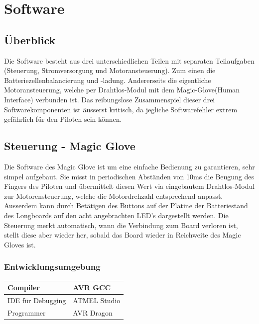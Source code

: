 \chapter{Software} \label{Software}
\section{Überblick}
Die Software besteht aus drei unterschiedlichen Teilen mit separaten Teilaufgaben (Steuerung, Stromversorgung und Motoransteuerung). Zum einen die Batteriezellenbalancierung und -ladung. Andererseits die eigentliche Motoransteuerung, welche per Drahtlos-Modul mit dem Magic-Glove(Human Interface) verbunden ist. Das reibungslose Zusammenspiel dieser drei Softwarekomponenten ist äusserst kritisch, da jegliche Softwarefehler extrem gefährlich für den Piloten sein können.
\section{Steuerung - Magic Glove} \label{SW_MagicGlove}
Die Software des Magic Glove ist um eine einfache Bedienung zu garantieren, sehr simpel aufgebaut. Sie misst in periodischen Abständen von 10ms die Beugung des Fingers des Piloten und übermittelt diesen Wert via eingebautem Drahtlos-Modul zur Motorensteuerung, welche die Motordrehzahl entsprechend anpasst. Ausserdem kann durch Betätigen des Buttons auf der Platine der Batteriestand des Longboards auf den acht angebrachten LED's dargestellt werden. Die Steuerung merkt automatisch, wann die Verbindung zum Board verloren ist, stellt diese aber wieder her, sobald das Board wieder in Reichweite des Magic Gloves ist.\\
\subsection*{Entwicklungsumgebung}
\begin{center}
	\begin{tabular}{  l | l  }
		\hline
		Compiler & AVR GCC \\ \hline
		IDE für Debugging & ATMEL Studio \\ \hline
		Programmer & AVR Dragon \\ \hline
	\end{tabular}
\end{center}
